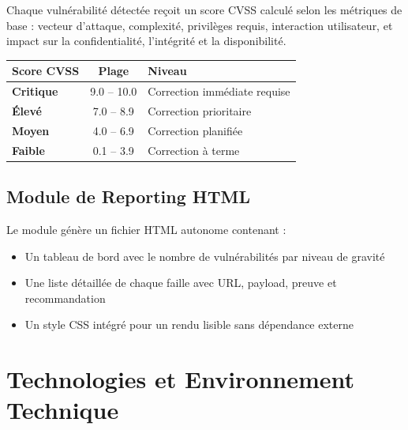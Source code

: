 \documentclass[12pt, a4paper]{report}
\begin{document}
Chaque vulnérabilité détectée reçoit un score CVSS calculé selon les métriques
de base : vecteur d'attaque, complexité, privilèges requis, interaction utilisateur,
et impact sur la confidentialité, l'intégrité et la disponibilité.

\begin{center}
\begin{tabular}{l c l}
  \toprule
  \textbf{Score CVSS} & \textbf{Plage} & \textbf{Niveau} \\
  \midrule
  \textcolor{critred}{\textbf{Critique}}    & 9.0 -- 10.0 & Correction immédiate requise \\
  \textcolor{highorange}{\textbf{Élevé}}    & 7.0 -- 8.9  & Correction prioritaire \\
  \textcolor{medyellow}{\textbf{Moyen}}     & 4.0 -- 6.9  & Correction planifiée \\
  \textcolor{lowgreen}{\textbf{Faible}}     & 0.1 -- 3.9  & Correction à terme \\
  \bottomrule
\end{tabular}
\end{center}

\subsection{Module de Reporting HTML}

Le module génère un fichier HTML autonome contenant :
\begin{itemize}[leftmargin=2em, itemsep=3pt]
  \item Un tableau de bord avec le nombre de vulnérabilités par niveau de gravité
  \item Une liste détaillée de chaque faille avec URL, payload, preuve et recommandation
  \item Un style CSS intégré pour un rendu lisible sans dépendance externe
\end{itemize}

\section{Technologies et Environnement Technique}
\end{document}
